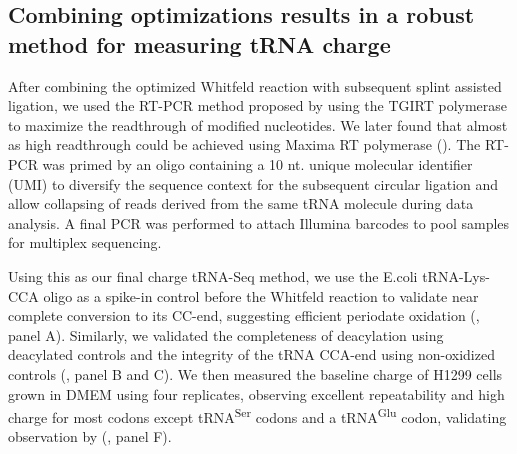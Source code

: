 \documentclass[9pt,lineno]{elife}
\begin{document}
\subsection{Combining optimizations results in a robust method for measuring tRNA charge}
After combining the optimized Whitfeld reaction with subsequent splint assisted ligation, we used the RT-PCR method proposed by \cite{Behrens2021-gb} using the TGIRT polymerase \citep{Mohr2013-hu} to maximize the readthrough of modified nucleotides.
We later found that almost as high readthrough could be achieved using Maxima RT polymerase ().
The RT-PCR was primed by an oligo containing a 10 nt. unique molecular identifier (UMI) to diversify the sequence context for the subsequent circular ligation and allow collapsing of reads derived from the same tRNA molecule during data analysis.
A final PCR was performed to attach Illumina barcodes to pool samples for multiplex sequencing.

Using this as our final charge tRNA-Seq method, we use the E.coli tRNA-Lys-CCA oligo as a spike-in control before the Whitfeld reaction to validate near complete conversion to its CC-end, suggesting efficient periodate oxidation (, panel A).
Similarly, we validated the completeness of deacylation using deacylated controls and the integrity of the tRNA CCA-end using non-oxidized controls (, panel B and C).
We then measured the baseline charge of H1299 cells grown in DMEM using four replicates, observing excellent repeatability and high charge for most codons except tRNA\textsuperscript{Ser} codons and a tRNA\textsuperscript{Glu} codon, validating observation by \cite{Evans2017-st} (, panel F).
\end{document}
